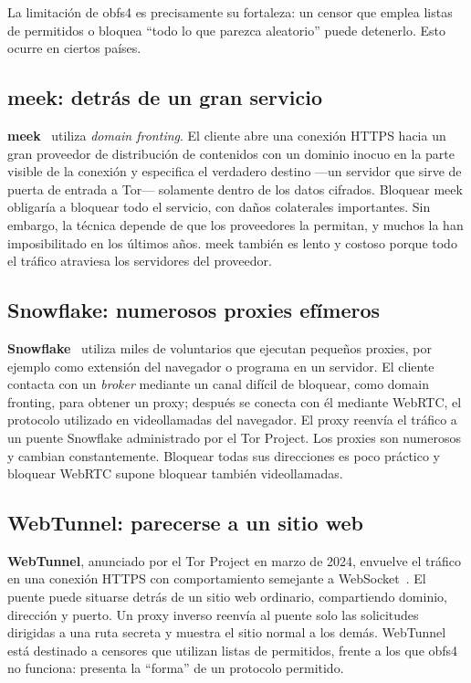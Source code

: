 La limitación de obfs4 es precisamente su fortaleza: un censor que emplea listas de permitidos o bloquea \enquote{todo lo que parezca aleatorio} puede detenerlo. Esto ocurre en ciertos países.

\subsection{meek: detrás de un gran servicio}

\textbf{meek}~\cite{fifield2015fronting} utiliza \emph{domain fronting}. El cliente abre una conexión HTTPS hacia un gran proveedor de distribución de contenidos con un dominio inocuo en la parte visible de la conexión y especifica el verdadero destino ---un servidor que sirve de puerta de entrada a Tor--- solamente dentro de los datos cifrados. Bloquear meek obligaría a bloquear todo el servicio, con daños colaterales importantes. Sin embargo, la técnica depende de que los proveedores la permitan, y muchos la han imposibilitado en los últimos años. meek también es lento y costoso porque todo el tráfico atraviesa los servidores del proveedor.

\subsection{Snowflake: numerosos proxies efímeros}

\textbf{Snowflake}~\cite{bocovich2024snowflake} utiliza miles de voluntarios que ejecutan pequeños proxies, por ejemplo como extensión del navegador o programa en un servidor. El cliente contacta con un \emph{broker} mediante un canal difícil de bloquear, como domain fronting, para obtener un proxy; después se conecta con él mediante WebRTC, el protocolo utilizado en videollamadas del navegador. El proxy reenvía el tráfico a un puente Snowflake administrado por el Tor Project. Los proxies son numerosos y cambian constantemente. Bloquear todas sus direcciones es poco práctico y bloquear WebRTC supone bloquear también videollamadas.

\subsection{WebTunnel: parecerse a un sitio web}

\textbf{WebTunnel}, anunciado por el Tor Project en marzo de 2024, envuelve el tráfico en una conexión HTTPS con comportamiento semejante a WebSocket~\cite{torblogwebtunnel}. El puente puede situarse detrás de un sitio web ordinario, compartiendo dominio, dirección y puerto. Un proxy inverso reenvía al puente solo las solicitudes dirigidas a una ruta secreta y muestra el sitio normal a los demás. WebTunnel está destinado a censores que utilizan listas de permitidos, frente a los que obfs4 no funciona: presenta la \enquote{forma} de un protocolo permitido.

